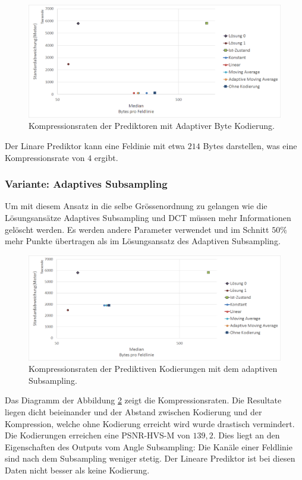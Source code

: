 \begin{figure}[!htbp]
	\center
	\includegraphics[width=1\textwidth,keepaspectratio]{./pictures/resultate/loesung2/variante0/resultate_byte.png}
	\caption{Kompressionsraten der Prediktoren mit Adaptiver Byte Kodierung.}
	\label{resultate:loesung2:simple:resultate_byte}
\end{figure}
Der Linare Prediktor kann eine Feldinie mit etwa $214$ Bytes darstellen, was eine Kompressionsrate von $4$ ergibt.

\subsubsection{Variante: Adaptives Subsampling}
Um mit diesem Ansatz in die selbe Grössenordnung zu gelangen wie die Lösungsansätze Adaptives Subsampling und DCT müssen mehr Informationen gelöscht werden. Es werden andere Parameter verwendet und im Schnitt $50\%$ mehr Punkte übertragen als im Lösungsansatz des Adaptiven Subsampling.
\begin{figure}[!htbp]
	\center
	\includegraphics[width=1\textwidth,keepaspectratio]{./pictures/resultate/loesung2/variante1/resultate_euler.png}
	\caption{Kompressionsraten der Prediktiven Kodierungen mit dem adaptiven Subsampling.}
	\label{resultate:loesung2:adaptive:euler}
\end{figure}
Das Diagramm der Abbildung \ref{resultate:loesung2:adaptive:euler} zeigt die Kompressionsraten. Die Resultate liegen dicht beieinander und der Abstand zwischen Kodierung und der Kompression, welche ohne Kodierung erreicht wird wurde drastisch vermindert. Die Kodierungen erreichen eine PSNR-HVS-M von $139,2$. Dies liegt an den Eigenschaften des Outputs vom Angle Subsampling: Die Kanäle einer Feldlinie sind nach dem Subsampling weniger stetig. Der Lineare Prediktor ist bei diesen Daten nicht besser als keine Kodierung.

